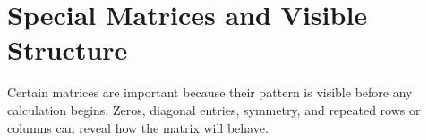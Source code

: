 \section{Special Matrices and Visible Structure}

\begin{corebox}
Certain matrices are important because their pattern is visible before any
calculation begins. Zeros, diagonal entries, symmetry, and repeated rows or
columns can reveal how the matrix will behave.
\end{corebox}





